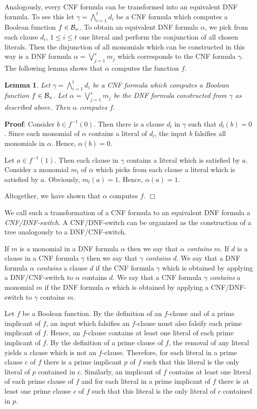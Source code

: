 \documentclass[11pt]{article}
\newtheorem{lem}{Lemma}
\begin{document}
Analogously, every CNF formula can be transformed into an equivalent DNF formula. To see this let
$\gamma = \bigwedge_{i=1}^t d_i$ be a CNF formula which computes a Boolean function $f \in {\cal B}_n$. To obtain an
equivalent DNF formula $\alpha$, we pick from each clause $d_i$, $1 \leq i \leq t$ one literal and perform the
conjunction of all chosen literals. Then the disjunction of all monomials which can be constructed in this way
is a DNF formula $\alpha = \bigvee_{j=1}^s m_j$ which corresponds to the CNF formula $\gamma$. The following lemma
shows that $\alpha$ computes the function $f$.
\begin{lem}  \label{lem2.2}
  Let $\gamma = \bigwedge_{i=1}^t d_i$ be a CNF formula which computes a Boolean function $f \in {\cal B}_n$. Let
  $\alpha = \bigvee_{j=1}^s m_j$ be the DNF formula constructed from $\gamma$ as described above. Then $\alpha$
  computes $f$.
\end{lem}
{\bf Proof}:
Consider $b \in f^{-1}(0)$. Then there is a clause $d_l$ in $\gamma$ such that $d_l(b) = 0$. Since each monomial of
$\alpha$ contains a literal of $d_l$, the input $b$ falsifies all monomials in $\alpha$. Hence, $\alpha(b) = 0$.

Let $a \in f^{-1}(1)$. Then each clause in $\gamma$ contains a literal which is satisfied by $a$. Consider a
monomial $m_l$ of $\alpha$ which picks from each clause a literal which is satisfied by $a$. Obviously, $m_l(a) = 1$.
Hence, $\alpha(a) = 1$.

Altogether, we have shown that $\alpha$ computes $f$.
$\Box$

\smallskip
We call such a transformation of a CNF formula to an equivalent DNF formula a {\em CNF/DNF-switch\/}.
A CNF/DNF-switch can be organized as the construction of a tree analogously to a DNF/CNF-switch.

If $m$ is a monomial in  a DNF formula $\alpha$ then we say that $\alpha$ {\em contains\/} $m$.
If $d$ is a clause in a CNF formula $\gamma$ then we say that {\em $\gamma$ contains $d$\/}.
We say that  a DNF formula $\alpha$ {\em contains\/}  a clause $d$ if the CNF formula $\gamma$ which
is obtained by applying a DNF/CNF-switch to $\alpha$ contains $d$.
We say that  a CNF formula $\gamma$ {\em contains\/}  a monomial $m$ if the DNF formula $\alpha$ which
is obtained by applying a CNF/DNF-switch to $\gamma$ contains $m$.

Let $f$ be a Boolean function. By the definition of an $f$-clause and of a prime implicant of $f$, an input which
falsifies an $f$-clause must also falsify each prime implicant of $f$. Hence, an $f$-clause contains at least one
literal of each prime implicant of $f$. By the definition of a prime clause of $f$, the removal of any literal
yields a clause which is not an $f$-clause. Therefore, for each literal in a prime clause $c$ of $f$ there is a
prime implicant $p$ of $f$ such that this literal is the only literal of $p$ contained in $c$. Similarly, an
implicant of $f$ contains at least one literal of each prime clause of $f$ and for each literal in a prime
implicant of $f$ there is at least one prime clause $c$ of $f$ such that this literal is the only literal of $c$
contained in $p$.
\end{document}
